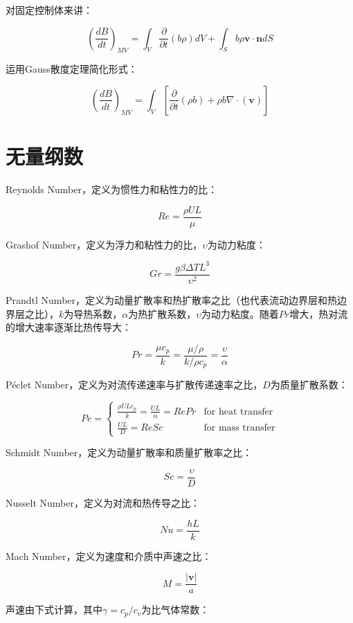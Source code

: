 对固定控制体来讲：

\begin{equation}
    \left( \frac{dB}{dt} \right)_{MV} = \int_V \frac{\partial}{\partial t}(b\rho)dV + \int_S b\rho\mathbf{v\cdot n} dS
\end{equation}

运用Gauss散度定理简化形式：

\begin{equation}
    \left( \frac{dB}{dt} \right)_{MV} = \int_V \left[ \frac{\partial}{\partial t}(\rho b) + \rho b \nabla\cdot(\mathbf{v}) \right]
\end{equation}

\section{无量纲数}

Reynolds Number，定义为惯性力和粘性力的比：

\[ Re = \frac{\rho UL}{\mu} \]

Grashof Number，定义为浮力和粘性力的比，$ \upsilon $为动力粘度：

\[ Gr = \frac{g\beta\Delta TL^3}{\upsilon^2} \]

Prandtl Number，定义为动量扩散率和热扩散率之比（也代表流动边界层和热边界层之比），$ k $为导热系数，$ \alpha $为热扩散系数，$ \upsilon $为动力粘度。随着$ Pr $增大，热对流的增大速率逐渐比热传导大：

\[ Pr = \frac{\mu c_p}{k} = \frac{\mu/\rho}{k/\rho c_p} = \frac{\upsilon}{\alpha} \]

P\'{e}clet Number，定义为对流传递速率与扩散传递速率之比，$ D $为质量扩散系数：

\[ Pe =
\begin{cases}
\frac{\rho ULc_p}{k} = \frac{UL}{\alpha} = RePr & \text{for heat transfer}\\
\frac{UL}{D} = ReSc & \text{for mass transfer}
\end{cases}
\]

Schmidt Number，定义为动量扩散率和质量扩散率之比：

\[ Sc = \frac{\upsilon}{D} \]

Nusselt Number，定义为对流和热传导之比：

\[Nu = \frac{hL}{k}\]

Mach Number，定义为速度和介质中声速之比：

\[ M = \frac{|\mathbf{v}|}{a} \]

声速由下式计算，其中$ \gamma=c_p/c_v $为比气体常数：

